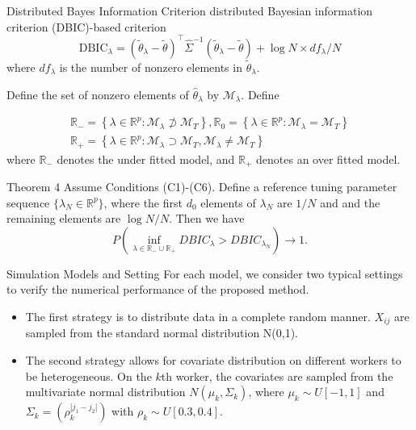 \documentclass[11pt]{beamer}
\begin{document}
\begin{frame}{Distributed Bayes Information Criterion}
distributed Bayesian information criterion (DBIC)-based criterion 
$$
\mathrm{DBIC}_{\lambda}=\left(\widetilde{\theta}_{\lambda}-\widetilde{\theta}\right)^{\top} \widehat{\Sigma}^{-1}\left(\widetilde{\theta}_{\lambda}-\widetilde{\theta}\right)+\log N \times d f_{\lambda} / N
$$
where $df_{\lambda}$ is the number of nonzero elements in $\tilde{\theta}_{\lambda}$.

Define the set of nonzero elements of $\hat{\theta}_{\lambda}$ by $\mathcal{M}_{\lambda}$. Define

$$
\begin{array}{c}
\mathbb{R}_{-}=\left\{\lambda \in \mathbb{R}^{p}: \mathcal{M}_{\lambda}  \not\supset \mathcal{M}_{T}\right\}, \mathbb{R}_{0}=\left\{\lambda \in \mathbb{R}^{p}: \mathcal{M}_{\lambda}=\mathcal{M}_{T}\right\} \\
\mathbb{R}_{+}=\left\{\lambda \in \mathbb{R}^{p}: \mathcal{M}_{\lambda} \supset \mathcal{M}_{T}, \mathcal{M}_{\lambda} \neq \mathcal{M}_{T}\right\}
\end{array}
$$
where $\mathbb{R}_{-}$ denotes the under fitted model, and $\mathbb{R}_{+}$ denotes an over fitted model.
\end{frame}

\begin{frame}{Theorem 4}
Assume Conditions (C1)-(C6). Define a reference tuning parameter
sequence $\{\lambda_N \in \mathbb{R}^p\}$, where the first $d_0$ elements of $\lambda_N$ are $1/N$ and and the remaining
elements are $\log N/N$. Then we have
$$
P\left(\inf _{\lambda \in \mathbb{R}_{-} \cup \mathbb{R}_{+}} D B I C_{\lambda}>D B I C_{\lambda_{N}}\right) \rightarrow 1.
$$
\end{frame}


\begin{frame}{Simulation Models and Setting}
For each model, 
we consider two typical settings to verify the numerical performance of the proposed
method. 
\begin{itemize}
\item The first strategy is to distribute data in a complete random manner. $X_{ij}$ are sampled from the standard normal
distribution N(0,1).
\item The second strategy allows for covariate distribution on different workers
to be heterogeneous.  On the $k$th worker, the covariates are sampled
from the multivariate normal distribution $N(\mu_k,\Sigma_k)$, where $\mu_k\sim U[-1,1]$ and $\Sigma_k=(\rho_k^{|j_1-j_2|})$ with $\rho_k\sim U[0.3,0.4]$.
\end{itemize}
\end{frame}
\end{document}
